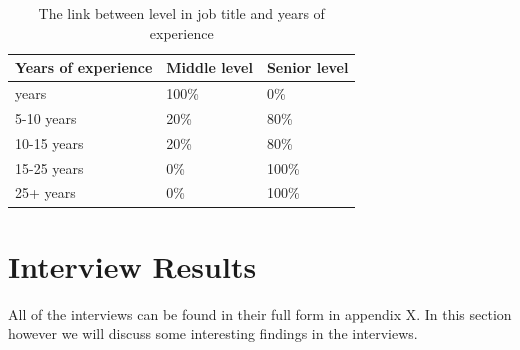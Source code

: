 \documentclass{cslthse-msc}
\begin{document}
    \begin{table}[H]
        \centering
        \caption{The link between level in job title and years of experience}
        \label{tab:experience_level}
        \begin{tabular}{|l|l|l|}
            \hline
            \textbf{Years of experience} & \textbf{Middle level} & \textbf{Senior level} \\ \hline
            \< 5 years           & 100\%         & 0\%           \\ \hline
            5-10 years        & 20\%          & 80\%          \\ \hline
            10-15 years       & 20\%          & 80\%          \\ \hline
            15-25 years       & 0\%           & 100\%         \\ \hline
            25+ years           & 0\%           & 100\%         \\ \hline
        \end{tabular}
    \end{table}

    \section{Interview Results}

    All of the interviews can be found in their full form in appendix X. In this section however
    we will discuss some interesting findings in the interviews.
\end{document}
